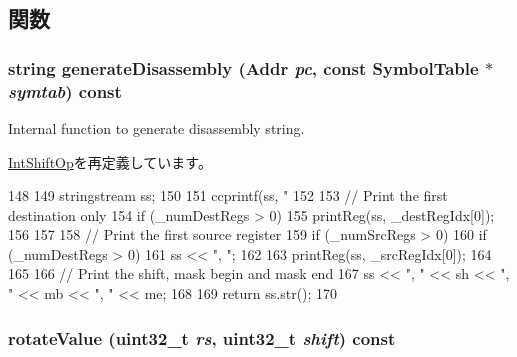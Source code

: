 \subsection{関数}
\hypertarget{classPowerISA_1_1IntRotateOp_a3134956ec18bb095818e06eb988f6c55}{
\subsubsection[{generateDisassembly}]{\setlength{\rightskip}{0pt plus 5cm}string generateDisassembly ({\bf Addr} {\em pc}, \/  const SymbolTable $\ast$ {\em symtab}) const}}
\label{classPowerISA_1_1IntRotateOp_a3134956ec18bb095818e06eb988f6c55}
Internal function to generate disassembly string. 

\hyperlink{classPowerISA_1_1IntShiftOp_a3134956ec18bb095818e06eb988f6c55}{IntShiftOp}を再定義しています。


\begin{DoxyCode}
148 {
149     stringstream ss;
150 
151     ccprintf(ss, "%
152 
153     // Print the first destination only
154     if (_numDestRegs > 0) {
155         printReg(ss, _destRegIdx[0]);
156     }
157 
158     // Print the first source register
159     if (_numSrcRegs > 0) {
160         if (_numDestRegs > 0) {
161             ss << ", ";
162         }
163         printReg(ss, _srcRegIdx[0]);
164     }
165 
166     // Print the shift, mask begin and mask end
167     ss << ", " << sh << ", " << mb << ", " << me;
168 
169     return ss.str();
170 }
\end{DoxyCode}
\hypertarget{classPowerISA_1_1IntRotateOp_a8b02df46b78e18d8a65efa679399d5ea}{
\subsubsection[{rotateValue}]{ rotateValue ({\bf uint32\_\-t} {\em rs}, \/  {\bf uint32\_\-t} {\em shift}) const}}
\label{classPowerISA_1_1IntRotateOp_a8b02df46b78e18d8a65efa679399d5ea}



